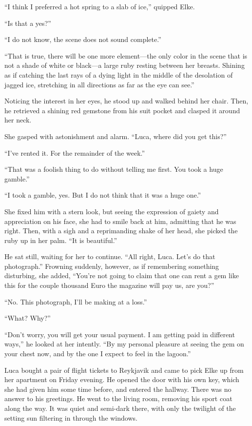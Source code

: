 ``I think I preferred a hot spring to a slab of ice,'' quipped Elke.

``Is that a yes?''

``I do not know, the scene does not sound complete.''

``That is true, there will be one more element---the only color in the scene that is not a shade of white or black---a large ruby resting between her breasts. Shining as if catching the last rays of a dying light in the middle of the desolation of jagged ice, stretching in all directions as far as the eye can see.''

Noticing the interest in her eyes, he stood up and walked behind her chair. Then, he retrieved a shining red gemstone from his suit pocket and clasped it around her neck.

She gasped with astonishment and alarm. ``Luca, where did you get this?''

``I've rented it. For the remainder of the week.''

``That was a foolish thing to do without telling me first. You took a huge gamble.''

``I took a gamble, yes. But I do not think that it was a huge one.''

She fixed him with a stern look, but seeing the expression of gaiety and appreciation on his face, she had to smile back at him, admitting that he was right. Then, with a sigh and a reprimanding shake of her head, she picked the ruby up in her palm. ``It is beautiful.''

He sat still, waiting for her to continue. ``All right, Luca. Let's do that photograph.'' Frowning suddenly, however, as if remembering something disturbing, she added, ``You're not going to claim that one can rent a gem like this for the couple thousand Euro the magazine will pay us, are you?''

``No. This photograph, I'll be making at a loss.''

``What? Why?''

``Don't worry, you will get your usual payment. I am getting paid in different ways,'' he looked at her intently. ``By my personal pleasure at seeing the gem on your chest now, and by the one I expect to feel in the lagoon.''

\sectionline

Luca bought a pair of flight tickets to Reykjavik and came to pick Elke up from her apartment on Friday evening. He opened the door with his own key, which she had given him some time before, and entered the hallway. There was no answer to his greetings. He went to the living room, removing his sport coat along the way. It was quiet and semi-dark there, with only the twilight of the setting sun filtering in through the windows.

